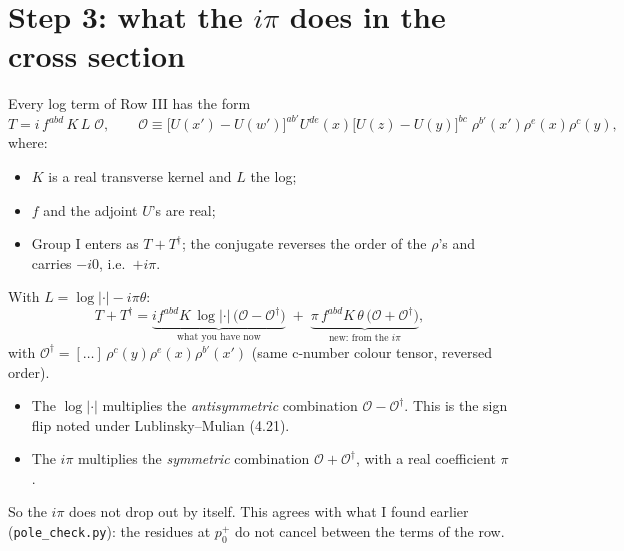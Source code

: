 \documentclass[10pt]{article}
\numberwithin{equation}{section}
\begin{document}
\section{Step 3: what the $i\pi$ does in the cross section}
Every log term of Row III has the form
\begin{equation}
T=i\,f^{abd}\,K\,L\;\mathcal O,\qquad \mathcal O\equiv\big[U(x')-U(w')\big]^{ab'}U^{de}(x)\big[U(z)-U(y)\big]^{bc}\;\rho^{b'}(x')\rho^{e}(x)\rho^{c}(y),
\end{equation}
where:
\begin{itemize}
\item $K$ is a real transverse kernel and $L$ the log;
\item $f$ and the adjoint $U$'s are real;
\item Group I enters as $T+T^\dagger$; the conjugate reverses the order of the $\rho$'s and carries $-i0$, i.e.\ $+i\pi$.
\end{itemize}
With $L=\log|\cdot|-i\pi\theta$:
\begin{equation}
T+T^\dagger=\underbrace{i f^{abd}K\,\log|\cdot|\,\big(\mathcal O-\mathcal O^\dagger\big)}_{\text{what you have now}}\;+\;\underbrace{\pi\,f^{abd}K\,\theta\,\big(\mathcal O+\mathcal O^\dagger\big)}_{\text{new: from the }i\pi},\label{eq:split}
\end{equation}
with $\mathcal O^\dagger=[\dots]\,\rho^{c}(y)\rho^{e}(x)\rho^{b'}(x')$ (same c-number colour tensor, reversed order).
\begin{itemize}
\item The $\log|\cdot|$ multiplies the \emph{antisymmetric} combination $\mathcal O-\mathcal O^\dagger$. This is the sign flip noted under Lublinsky--Mulian (4.21).
\item The $i\pi$ multiplies the \emph{symmetric} combination $\mathcal O+\mathcal O^\dagger$, with a real coefficient $\pi$.
\end{itemize}
So the $i\pi$ does not drop out by itself. This agrees with what I found earlier (\texttt{pole\_check.py}): the residues at $p_0^+$ do not cancel between the terms of the row.
\end{document}
